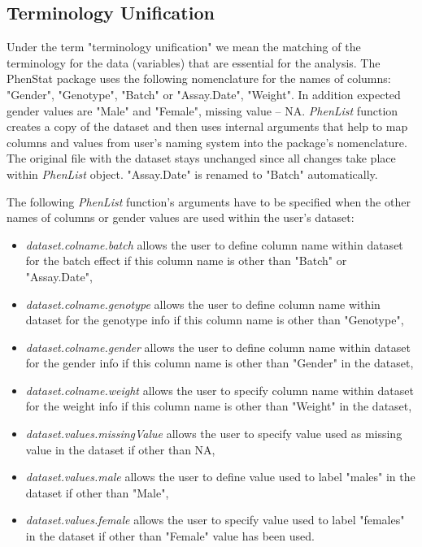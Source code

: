 \documentclass[12pt,a4paper]{article}
\begin{document}
\subsection{Terminology Unification}
Under the term "terminology unification" we mean the matching of the terminology for the data (variables) that are essential for the analysis. 
The PhenStat package uses the following nomenclature for the names of columns: "Gender", "Genotype", "Batch" or "Assay.Date", "Weight". In addition expected gender values are "Male" and "Female", missing value -- NA. 
\textit{PhenList} function creates a copy of the dataset and then uses internal arguments that help to map columns and values from user's naming system into the package's nomenclature. 
The original file with the dataset stays unchanged since all changes take place within \textit{PhenList} object.  "Assay.Date" is renamed to "Batch" automatically.

The following \textit{PhenList} function's arguments have to be specified when the other names of columns or gender values are used within the user's dataset:
\begin{itemize}
\item \textit{dataset.colname.batch} allows the user to define column name within dataset for the batch effect if this column name is other than "Batch" or "Assay.Date", 
\item \textit{dataset.colname.genotype} allows the user to define column name within dataset for the genotype info if this column name is other than "Genotype", 
\item \textit{dataset.colname.gender} allows the user to define column name within dataset for the gender info if this column name is other than "Gender" in the dataset, 
\item \textit{dataset.colname.weight}  allows the user to specify column name within dataset for the weight info if this column name is other than "Weight" in the dataset, 
\item \textit{dataset.values.missingValue}  allows the user to specify value used as missing value in the dataset if other than NA,
\item \textit{dataset.values.male} allows the user to define value used to label "males" in the dataset if other than "Male", 
\item \textit{dataset.values.female} allows the user to specify value used to label "females" in the dataset if other than "Female" value has been used.
\end{itemize} 
\end{document}

